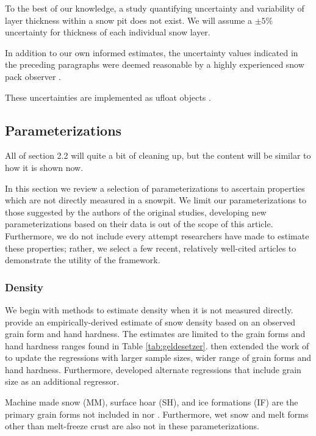 \documentclass[journal abbreviation, manuscript]{copernicus}
\begin{document}
To the best of our knowledge, a study quantifying uncertainty and variability of layer thickness within a snow pit does not exist. We will assume a $\pm5\%$ uncertainty for thickness of each individual snow layer.

In addition to our own informed estimates, the uncertainty values indicated in the preceding paragraphs were deemed reasonable by a highly experienced snow pack observer \citep{birkeland2025}.

These uncertainties are implemented as ufloat objects \citep{lebigot2010uncertainties}.






\subsection{Parameterizations}

\textcolor{RubineRed}{All of section 2.2 will quite a bit of cleaning up, but the content will be similar to how it is shown now.}

In this section we review a selection of parameterizations to ascertain properties which are not directly measured in a snowpit. We limit our parameterizations to those suggested by the authors of the original studies, developing new parameterizations based on their data is out of the scope of this article. Furthermore, we do not include every attempt researchers have made to estimate these properties; rather, we select a few recent, relatively well-cited articles to demonstrate the utility of the framework.

\subsubsection{Density}
We begin with methods to estimate density when it is not measured directly. \citet{geldsetzer2000} provide an empirically-derived estimate of snow density based on an observed grain form and hand hardness. The estimates are limited to the grain forms and hand hardness ranges found in Table \ref{tab:geldesetzer}. \citet{kim2014} then extended the work of \citet{geldsetzer2000} to update the regressions with larger sample sizes, wider range of grain forms and hand hardness. Furthermore, \citet{kim2014} developed alternate regressions that include grain size as an additional regressor.

Machine made snow (MM), surface hoar (SH), and ice formations (IF) are the primary grain forms \citep{fierz2009} not included in \citet{kim2014} nor \citet{geldsetzer2000}. Furthermore, wet snow and melt forms other than melt-freeze crust are also not in these parameterizations.
\end{document}
